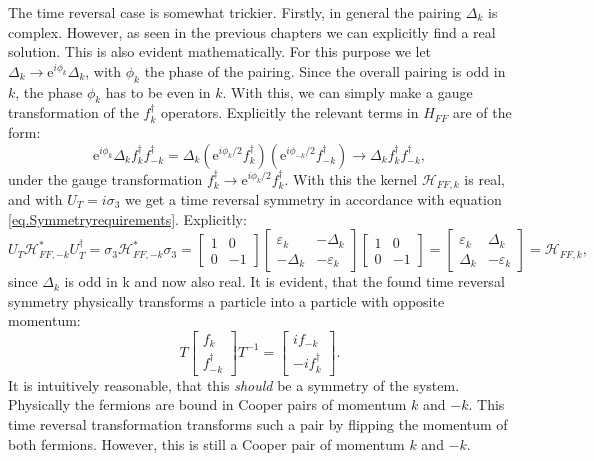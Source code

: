 The time reversal case is somewhat trickier. Firstly, in general the pairing $\Delta_k$ is complex. However, as seen in the previous chapters we can explicitly find a real solution. This is also evident mathematically. For this purpose we let $\Delta_k \to \text{e}^{i\phi_k}\Delta_k$, with $\phi_k$ the phase of the pairing. Since the overall pairing is odd in $k$, the phase $\phi_k$ has to be even in $k$. With this, we can simply make a gauge transformation of the $f_k^\dagger$ operators. Explicitly the relevant terms in $H_{FF}$ are of the form:
\begin{equation}
\text{e}^{i\phi_k}\Delta_k f^\dagger_k f^\dagger_{-k} = \Delta_k (\text{e}^{i\phi_k/2}f^\dagger_k )(\text{e}^{i\phi_{-k}/2}f^\dagger_{-k} ) \to \Delta_k f^\dagger_k f^\dagger_{-k}, \nonumber
\end{equation}
under the gauge transformation $f^\dagger_k \to \text{e}^{i\phi_k/2} f^\dagger_k$. With this the kernel $\mathcal{H}_{FF,k}$ is real, and with $U_T = i\sigma_3$ we get a time reversal symmetry in accordance with equation \ref{eq.Symmetryrequirements}. Explicitly:
\begin{equation}
U_T\mathcal{H}^*_{FF,-k}U^\dagger_T = \sigma_3\mathcal{H}^*_{FF,-k}\sigma_3 = \begin{bmatrix} 1 & 0 \\ 0 & -1 \end{bmatrix}\begin{bmatrix} \varepsilon_k & -\Delta_k \\ -\Delta_k & -\varepsilon_k \end{bmatrix} \begin{bmatrix} 1 & 0 \\ 0 & -1 \end{bmatrix} = \begin{bmatrix} \varepsilon_k & \Delta_k \\ \Delta_k & -\varepsilon_k \end{bmatrix} = \mathcal{H}_{FF,k}, \nonumber
\end{equation}
since $\Delta_k$ is odd in k and now also real. It is evident, that the found time reversal symmetry physically transforms a particle into a particle with opposite momentum:
\begin{equation}
T \begin{bmatrix} f_k \\ f^\dagger_{-k} \end{bmatrix} T^{-1} = \begin{bmatrix} i f_{-k} \\ - i f^\dagger_{k} \end{bmatrix}. \nonumber
\end{equation}
It is intuitively reasonable, that this \textit{should} be a symmetry of the system. Physically the fermions are bound in Cooper pairs of momentum $k$ and $-k$. This time reversal transformation transforms such a pair by flipping the momentum of both fermions. However, this is still a Cooper pair of momentum $k$ and $-k$.  

